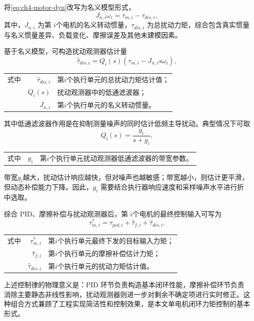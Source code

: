 将\cref{eq:ch4-motor-dyn}改写为名义模型形式，
\begin{equation}
  J_{n,i}\dot{\omega}_i = \tau_{m,i} - \tau_{dis,i}, \label{eq:ch4-nominal}
\end{equation}
其中，$J_{n,i}$ 为第 $i$个电机的名义转动惯量，$\tau_{dis,i}$ 为总扰动力矩，综合包含真实惯量与名义惯量差异、负载变化、摩擦误差及其他未建模因素。

基于名义模型，可构造扰动观测器估计量
\begin{equation}
  \hat{\tau}_{dis,i} = Q_i(s) \left( \tau_{m,i} - J_{n,i}s\omega_i \right), \label{eq:ch4-dob}
\end{equation}
\begin{tabularx}{\textwidth}{@{}l@{\quad}r@{———}X@{}}
  式中 & $\hat{\tau}_{dis,i}$ & 第$i$个执行单元的总扰动力矩估计值；\\
       & $Q_i(s)$ & 扰动观测器中的低通滤波器；\\
       & $J_{n,i}$ & 第$i$个执行单元的名义转动惯量。
\end{tabularx}
其中低通滤波器作用是在抑制测量噪声的同时估计低频主导扰动。典型情况下可取
\begin{equation}
  Q_i(s)=\frac{g_i}{s+g_i}, \label{eq:ch4-qfilter}
\end{equation}
\begin{tabularx}{\textwidth}{@{}l@{\quad}r@{———}X@{}}
  式中 & $g_i$ & 第$i$个执行单元扰动观测器低通滤波器的带宽参数。
\end{tabularx}
带宽$g_i$越大，扰动估计响应越快，但对噪声也越敏感；带宽越小，则估计更平滑，但动态补偿能力下降。因此，$g_i$ 需要结合执行器响应速度和采样噪声水平进行折中选取。

综合 PID、摩擦补偿与扰动观测器后，第 $i$个电机的最终控制输入可写为
\begin{equation}
  \tau_{m,i}^\ast = \tau_{pid,i} + \hat{\tau}_{f,i} + \hat{\tau}_{dis,i}. \label{eq:ch4-final-inner}
\end{equation}
\begin{tabularx}{\textwidth}{@{}l@{\quad}r@{———}X@{}}
  式中 & $\tau_{m,i}^\ast$ & 第$i$个执行单元最终下发的目标输入力矩；\\
       & $\hat{\tau}_{f,i}$ & 第$i$个执行单元的摩擦补偿估计力矩；\\
       & $\hat{\tau}_{dis,i}$ & 第$i$个执行单元的扰动力矩估计值。
\end{tabularx}

上述控制律的物理意义是：PID 环节负责构造基本闭环性能，摩擦补偿环节负责消除主要静态非线性影响，扰动观测器则进一步对剩余不确定项进行实时修正。这种组合方式兼顾了工程实现简洁性和控制效果，是本文单电机闭环力矩控制的基本形式。




